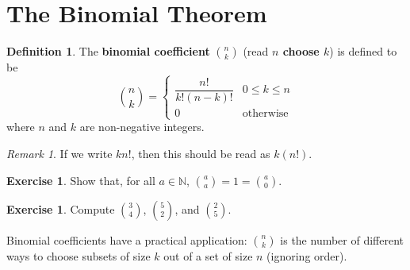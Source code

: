 \documentclass[a4paper, 10pt]{amsart}
\theoremstyle{definition}
\newtheorem{defn}[thm]{Definition}
\newtheorem{exercise}[thm]{Exercise}
\theoremstyle{remark}
\newtheorem{rem}[thm]{Remark}
\begin{document}
\section{The Binomial Theorem}
\begin{defn}
  The \textbf{binomial coefficient} $ \binom{n}{k} $ (read \textbf{$ n $ choose $ k $}) is defined to be
  \begin{displaymath}
    \binom{n}{k} = \begin{cases}
                     \dfrac{n!}{k!(n - k)!} & 0 \leq k \leq n\\
                     0 & \text{otherwise}
                   \end{cases}
  \end{displaymath}
  where $ n $ and $ k $ are non-negative integers.
\end{defn}

\begin{rem}
  If we write $ kn! $, then this should be read as $ k(n!) $.
\end{rem}

\begin{exercise}
  Show that, for all $ a \in \mathbb{N} $, $ \binom{a}{a} = 1 = \binom{a}{0} $.
\end{exercise}

\begin{exercise}
  Compute $ \binom{3}{4} $, $ \binom{5}{2} $, and $ \binom{2}{5} $.
\end{exercise}

Binomial coefficients have a practical application: $ \binom{n}{k} $ is the number of different ways to choose subsets of size $ k $
out of a set of size $ n $ (ignoring order).
\end{document}

